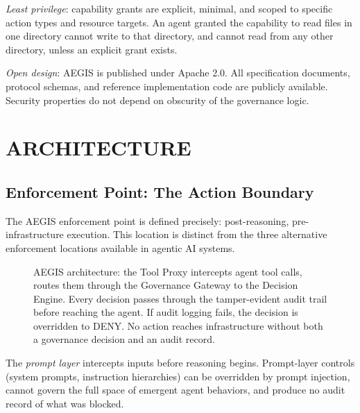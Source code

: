 \documentclass{IEEEcsmag}
\begin{document}
{\it Least privilege}: capability grants are explicit, minimal, and scoped to specific action types and resource targets. An agent granted the capability to read files in one directory cannot write to that directory, and cannot read from any other directory, unless an explicit grant exists.

{\it Open design}: AEGIS is published under Apache 2.0. All specification documents, protocol schemas, and reference implementation code are publicly available. Security properties do not depend on obscurity of the governance logic.

\section{ARCHITECTURE}

\subsection{Enforcement Point: The Action Boundary}

The AEGIS enforcement point is defined precisely: post-reasoning, pre-infrastructure execution. This location is distinct from the three alternative enforcement locations available in agentic AI systems.

\begin{figure}[!t]
\centering
{}
\caption{AEGIS architecture: the Tool Proxy intercepts agent tool calls, routes them through the Governance Gateway to the Decision Engine. Every decision passes through the tamper-evident audit trail before reaching the agent. If audit logging fails, the decision is overridden to DENY. No action reaches infrastructure without both a governance decision and an audit record.}
\label{fig:architecture}
\end{figure}

The {\it prompt layer} intercepts inputs before reasoning begins. Prompt-layer controls (system prompts, instruction hierarchies) can be overridden by prompt injection, cannot govern the full space of emergent agent behaviors, and produce no audit record of what was blocked.
\end{document}
